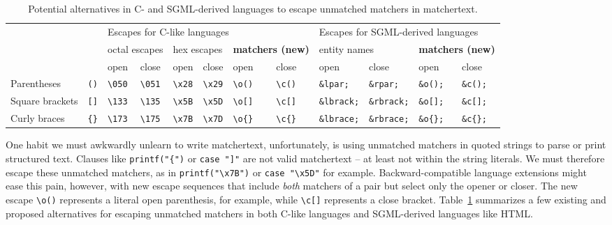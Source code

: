 \begin{table}[t]
\begin{center}
\begin{footnotesize}
\begin{tabular}{ll||ll|ll|ll||ll|ll}
&		& \multicolumn{6}{|l||}{Escapes for C-like languages}
		& \multicolumn{4}{|l}{Escapes for SGML-derived languages} \\
&		& \multicolumn{2}{|l|}{octal escapes}
		& \multicolumn{2}{|l|}{hex escapes}
		& \multicolumn{2}{|l||}{\bf matchers (new)}
		& \multicolumn{2}{|l|}{entity names}
		& \multicolumn{2}{|l}{\bf matchers (new)}		\\
		&
		& open			& close
		& open			& close
		& open			& close
		& open			& close
		& open			& close		\\
\hline
Parentheses	& \verb|()|
		& \verb|\050|		& \verb|\051|
		& \verb|\x28|		& \verb|\x29|
		& \verb|\o()|		& \verb|\c()|
		& \verb|&lpar;|		& \verb|&rpar;|
		& \verb|&o();|		& \verb|&c();|	\\
Square brackets	& \verb|[]|
		& \verb|\133|		& \verb|\135|
		& \verb|\x5B|		& \verb|\x5D|
		& \verb|\o[]|		& \verb|\c[]|
		& \verb|&lbrack;|	& \verb|&rbrack;|
		& \verb|&o[];|		& \verb|&c[];|	\\
		
Curly braces	& \verb|{}|
		& \verb|\173|		& \verb|\175|
		& \verb|\x7B|		& \verb|\x7D|
		& \verb|\o{}|		& \verb|\c{}|
		& \verb|&lbrace;|	& \verb|&rbrace;|
		& \verb|&o{};|		& \verb|&c{};|	\\

\end{tabular}
\end{footnotesize}
\end{center}
\label{tab:unmatched-matchers}
\caption{Potential alternatives in C- and SGML-derived languages
	to escape unmatched matchers in matchertext.}
\end{table}

One habit we must awkwardly unlearn to write matchertext,
unfortunately,
is using unmatched matchers in quoted strings
to parse or print structured text.
Clauses like \verb|printf("{")| or \verb|case "]"|
are not valid matchertext --
at least not within the string literals.
We must therefore escape these unmatched matchers,
as in \verb|printf("\x7B")| or \verb|case "\x5D"| for example.
Backward-compatible language extensions might ease this pain,
however, 
with new escape sequences that include \emph{both} matchers of a pair
but select only the opener or closer.
The new escape \verb|\o()| represents a literal open parenthesis,
for example,
while \verb|\c[]| represents a close bracket.
Table~\ref{tab:unmatched-matchers} summarizes a few existing and proposed
alternatives for escaping unmatched matchers
in both C-like languages and SGML-derived languages like HTML.


